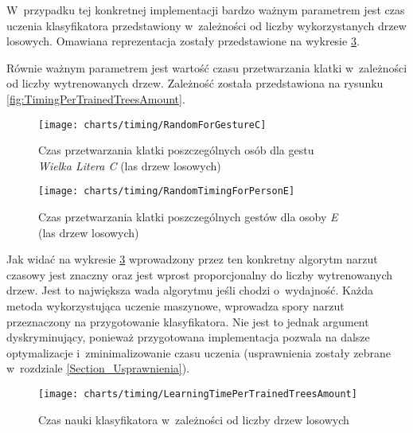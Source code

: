     W~przypadku tej konkretnej implementacji bardzo ważnym parametrem jest czas uczenia klasyfikatora przedstawiony w~zależności od liczby wykorzystanych drzew losowych. Omawiana reprezentacja zostały przedstawione na wykresie \ref{fig:LearningTime}.

    Równie ważnym parametrem jest wartość czasu przetwarzania klatki w~zależności od liczby wytrenowanych drzew. Zależność została przedstawiona na rysunku \ref{fig:TimingPerTrainedTreesAmount}.

    \newpage
    \begin{figure}[!ht]
      \centering
      \texttt{[image: charts/timing/RandomForGestureC]}
      \caption[Czas przetwarzania klatki poszczególnych osób dla gestu C]
              {Czas przetwarzania klatki poszczególnych osób dla gestu\\\textit{Wielka Litera C} (las drzew losowych)}
      \label{fig:RandomForGestureC}
    \end{figure}

    \begin{figure}[!ht]
      \centering
      \texttt{[image: charts/timing/RandomTimingForPersonE]}
      \caption[Czas przetwarzania klatki poszczególnych gestów dla osoby E]
              {Czas przetwarzania klatki poszczególnych gestów dla osoby \textit{E}\\(las drzew losowych)}
      \label{fig:RandomTimingForPersonE}
    \end{figure}

    \newpage
    Jak widać na wykresie \ref{fig:LearningTime} wprowadzony przez ten konkretny algorytm narzut czasowy jest znaczny oraz jest wprost proporcjonalny do liczby wytrenowanych drzew. Jest to największa wada algorytmu jeśli chodzi o~wydajność. Każda metoda wykorzystująca uczenie maszynowe, wprowadza spory narzut przeznaczony na przygotowanie klasyfikatora. Nie jest to jednak argument dyskryminujący, ponieważ przygotowana implementacja pozwala na dalsze optymalizacje i~zminimalizowanie czasu uczenia (usprawnienia zostały zebrane w~rozdziale \ref{Section_Usprawnienia}).

    \begin{figure}[!ht]
      \centering
      \texttt{[image: charts/timing/LearningTimePerTrainedTreesAmount]}
      \caption[Czas nauki klasyfikatora w~zależności od liczby drzew losowych]
              {Czas nauki klasyfikatora w~zależności od liczby drzew losowych}
      \label{fig:LearningTime}
    \end{figure}

